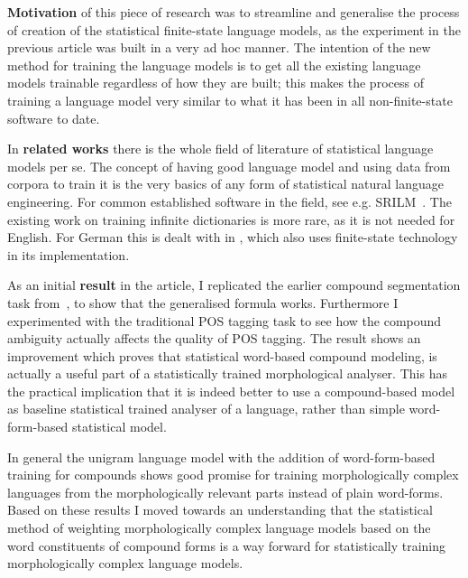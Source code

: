 \documentclass[officiallayout]{unihelcompling}
\begin{document}
\textbf{Motivation} of this piece of research was to streamline and generalise
the process of creation of the statistical finite-state language models, as the
experiment in the previous article  was built
in a very ad hoc manner. The intention of the new method for training the
language models is to get all the existing language models trainable regardless
of how they are built; this makes the process of training a language model very
similar to what it has been in all non-finite-state software to date.

In \textbf{related works} there is the whole field of literature of statistical
language models per se. The concept of having good language model and using
data from corpora to train it is the very basics of any form of statistical
natural language engineering. For common established software in the field, see
e.g.  SRILM~\citep{stolcke2002srilm}.  The existing work on training infinite
dictionaries is more rare, as it is not needed for English. For German this is
dealt with in \citep{schiller2006german}, which also uses finite-state
technology in its implementation.

As an initial \textbf{result} in the article, I replicated the earlier compound
segmentation task from~, to show that the generalised formula works.
Furthermore I experimented with the traditional POS tagging task to see how the
compound ambiguity actually affects the quality of POS tagging. The result
shows an improvement which proves that statistical word-based compound
modeling, is actually a useful part of a statistically trained morphological
analyser. This has the practical implication that it is indeed better to
use a compound-based model as baseline statistical trained analyser
of a language, rather than simple word-form-based statistical model.

In general the unigram language model with the addition of word-form-based
training for compounds shows good promise for training
morphologically complex languages from the morphologically relevant parts
instead of plain word-forms. Based on these results I moved towards an 
understanding that the statistical method of weighting morphologically complex
language models based on the word constituents of compound forms is a way 
forward for statistically training morphologically complex language models.
\end{document}
